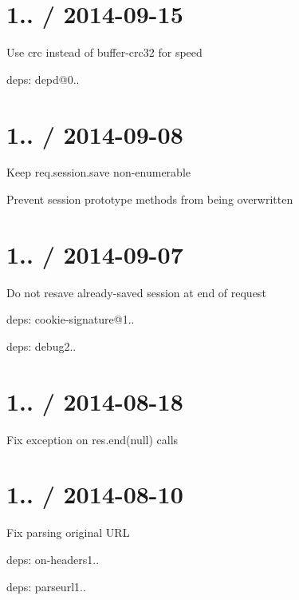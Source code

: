 \section*{1.. / 2014-\/09-\/15 }


\begin{DoxyItemize}
\item Use {\ttfamily crc} instead of {\ttfamily buffer-\/crc32} for speed
\item deps\+: depd@0..
\end{DoxyItemize}

\section*{1.. / 2014-\/09-\/08 }


\begin{DoxyItemize}
\item Keep {\ttfamily req.\+session.\+save} non-\/enumerable
\item Prevent session prototype methods from being overwritten
\end{DoxyItemize}

\section*{1.. / 2014-\/09-\/07 }


\begin{DoxyItemize}
\item Do not resave already-\/saved session at end of request
\item deps\+: cookie-\/signature@1..
\item deps\+: debug2..
\end{DoxyItemize}

\section*{1.. / 2014-\/08-\/18 }


\begin{DoxyItemize}
\item Fix exception on {\ttfamily res.\+end(null)} calls
\end{DoxyItemize}

\section*{1.. / 2014-\/08-\/10 }


\begin{DoxyItemize}
\item Fix parsing original U\+RL
\item deps\+: on-\/headers1..
\item deps\+: parseurl1..
\end{DoxyItemize}

